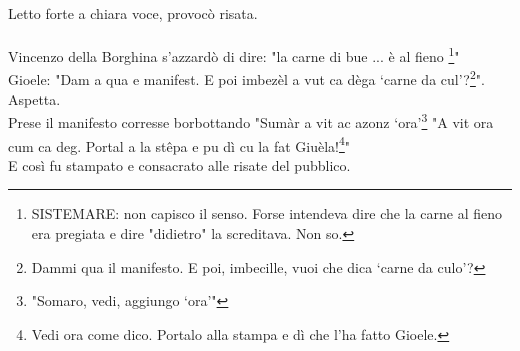 \noindent Letto forte a chiara voce, provocò risata.\\\\
 Vincenzo della Borghina s'azzardò di dire: "la carne di bue ... è al fieno \footnote{SISTEMARE: non capisco il senso. Forse intendeva dire che la carne al fieno era pregiata e dire "didietro" la screditava. Non so.}"\\
Gioele: "Dam a qua e manifest. E poi imbezèl a vut ca dèga ‘carne da cul'?\footnote{Dammi qua il manifesto. E poi, imbecille, vuoi che dica ‘carne da culo'?}". \\Aspetta.\\Prese il manifesto corresse borbottando "Sumàr a vit ac azonz ‘ora'\footnote{"Somaro, vedi, aggiungo ‘ora'"}
\newpage
{} \normalsize \normalfont
"A vit ora cum ca deg. Portal a la stêpa e pu dì cu la fat Giuèla!\footnote{Vedi ora come dico. Portalo alla stampa e dì che l'ha fatto Gioele.}"\\
E così fu stampato e consacrato alle risate del pubblico.
